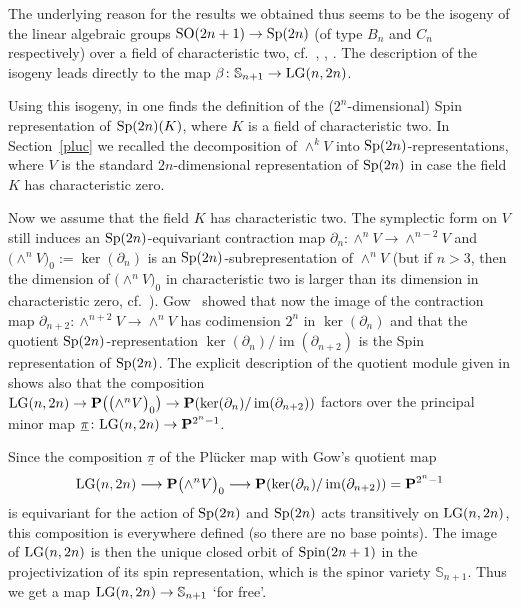 \documentclass[10pt,a4paper]{amsart}
\newcommand{\PP}{{\bf P}}
\newcommand{\bS}{{\mathbb S}}
\newcommand{\im}{\operatorname{im}}
\numberwithin{equation}{section}
\begin{document}
\begin{Remark}\label{remarkisog} The underlying reason for the results we obtained thus seems to be the isogeny of the linear algebraic groups ${\rm SO}(2n+1)\rightarrow {\rm Sp}(2n)$ (of type $B_n$ and $C_n$ respectively) over a field of characteristic two, cf.\ \cite[Section~4.11]{Steinberg}, \cite{Milne}, \cite[Section~7.1, Remark 7.1.6]{CGP}. The description of the isogeny leads directly to the map $\beta\colon \bS_{n+1}\rightarrow {\rm LG}(n,2n)$.

Using this isogeny, in \cite[p.~197]{Kleidman} one finds the definition of the ($2^n$-dimensional) Spin representation of ${\rm Sp}(2n)(K)$, where $K$ is a field of characteristic two. In Section~\ref{pluc} we recalled the decomposition of $\wedge^kV$ into ${\rm Sp}(2n)$-representations, where $V$ is the standard $2n$-dimensional representation of ${\rm Sp}(2n)$ in case the field $K$ has characteristic zero.

Now we assume that the field $K$ has characteristic two. The symplectic form on $V$ still induces an ${\rm Sp}(2n)$-equivariant contraction map $\partial_n\colon \wedge^nV\rightarrow \wedge^{n-2}V$ and $\big({\wedge}^nV\big)_0:=\ker(\partial_n)$ is an ${\rm Sp}(2n)$-subrepresentation of $\wedge^n V$ (but if $n>3$, then the dimension of $\big({\wedge}^nV\big)_0$ in characteristic two is larger than its dimension in characteristic zero, cf.\ \cite[Theorem~2.2]{Gow}). Gow~\cite{Gow} showed that now the image of the contraction map $\partial_{n+2}\colon \wedge^{n+2}V\rightarrow \wedge^nV$ has codimension $2^n$ in $\ker(\partial_n)$ and that the quotient ${\rm Sp}(2n)$-representation $\ker(\partial_n)/\im(\partial_{n+2})$ is the Spin representation of ${\rm Sp}(2n)$. The explicit description of the quotient module given in \cite[Section~3]{Gow} shows also that the composition ${\rm LG}(n,2n)\rightarrow\PP\big(\big({\wedge}^n V\big)_0\big)\rightarrow\PP(\ker(\partial_n)/\im(\partial_{n+2}))$ factors over the principal minor map $\underline{\pi}\colon {\rm LG}(n,2n)\rightarrow\PP^{2^n-1}$.

Since the composition $\underline{\pi}$ of the Pl\"ucker map with Gow's quotient map
\begin{gather*}
{\rm LG}(n,2n) \longrightarrow \PP\big({\wedge}^nV\big)_0 \longrightarrow \PP(\ker(\partial_n)/\im(\partial_{n+2})) = \PP^{2^n-1}
\end{gather*}
is equivariant for the action of ${\rm Sp}(2n)$ and ${\rm Sp}(2n)$ acts transitively on ${\rm LG}(n,2n)$, this composition is everywhere defined (so there are no base points). The image of ${\rm LG}(n,2n)$ is then the unique closed orbit of ${\rm Spin}(2n+1)$ in the projectivization of its spin representation, which is the spinor variety $\bS_{n+1}$. Thus we get a map ${\rm LG}(n,2n)\rightarrow \bS_{n+1}$ `for free'.


\end{Remark}
\end{document}
